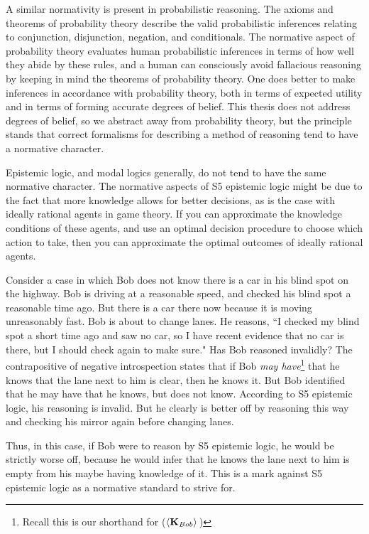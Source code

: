 A similar normativity is present in probabilistic reasoning. The axioms and theorems of probability theory describe the valid probabilistic inferences relating to conjunction, disjunction, negation, and conditionals. The normative aspect of probability theory evaluates human probabilistic inferences in terms of how well they abide by these rules, and a human can consciously avoid fallacious reasoning by keeping in mind the theorems of probability theory. One does better to make inferences in accordance with probability theory, both in terms of expected utility and in terms of forming accurate degrees of belief. This thesis does not address degrees of belief, so we abstract away from probability theory, but the principle stands that correct formalisms for describing a method of reasoning tend to have a normative character.

Epistemic logic, and modal logics generally, do not tend to have the same normative character. The normative aspects of S5 epistemic logic might be due to the fact that more knowledge allows for better decisions, as is the case with ideally rational agents in game theory. If you can approximate the knowledge conditions of these agents, and use an optimal decision procedure to choose which action to take, then you can approximate the optimal outcomes of ideally rational agents. 

Consider a case in which Bob does not know there is a car in his blind spot on the highway. Bob is driving at a reasonable speed, and checked his blind spot a reasonable time ago. But there is a car there now because it is moving unreasonably fast. Bob is about to change lanes. He reasons, ``I checked my blind spot a short time ago and saw no car, so I have recent evidence that no car is there, but I should check again to make sure." Has Bob reasoned invalidly? The contrapositive of negative introspection states that if Bob \emph{may have}\footnote{Recall this is our shorthand for ($\langle \mathbf{K}_{Bob} \rangle\,$)} that he knows that the lane next to him is clear, then he knows it. But Bob identified that he may have that he knows, but does not know. According to S5 epistemic logic, his reasoning is invalid. But he clearly is better off by reasoning this way and checking his mirror again before changing lanes.

Thus, in this case, if Bob were to reason by S5 epistemic logic, he would be strictly worse off, because he would infer that he knows the lane next to him is empty from his maybe having knowledge of it. This is a mark against S5 epistemic logic as a normative standard to strive for.

